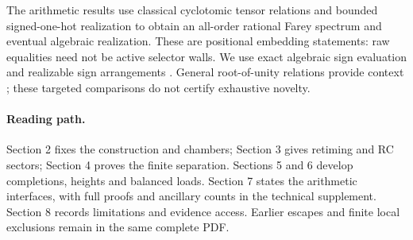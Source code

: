 The arithmetic results use classical cyclotomic tensor relations \cite{MartinReiner2005,DeCarliLaporta2026} and bounded signed-one-hot realization to obtain an all-order rational Farey spectrum and eventual algebraic realization. These are positional embedding statements: raw equalities need not be active selector walls. We use exact algebraic sign evaluation \cite{EmirisTsigaridas2005} and realizable sign arrangements \cite{BjornerEtAl1999}. General root-of-unity relations provide context \cite{Mann1965,ConwayJones1976,LamLeung2000,Steinberger2008,KoleyArikatla2019,ChristieDykemaKlep2020,KissEtAl2026}; these targeted comparisons do not certify exhaustive novelty.

\paragraph{Reading path.}
Section 2 fixes the construction and chambers; Section 3 gives retiming and RC sectors; Section 4 proves the finite separation. Sections 5 and 6 develop completions, heights and balanced loads. Section 7 states the arithmetic interfaces, with full proofs and ancillary counts in the technical supplement. Section 8 records limitations and evidence access. Earlier escapes and finite local exclusions remain in the same complete PDF.
